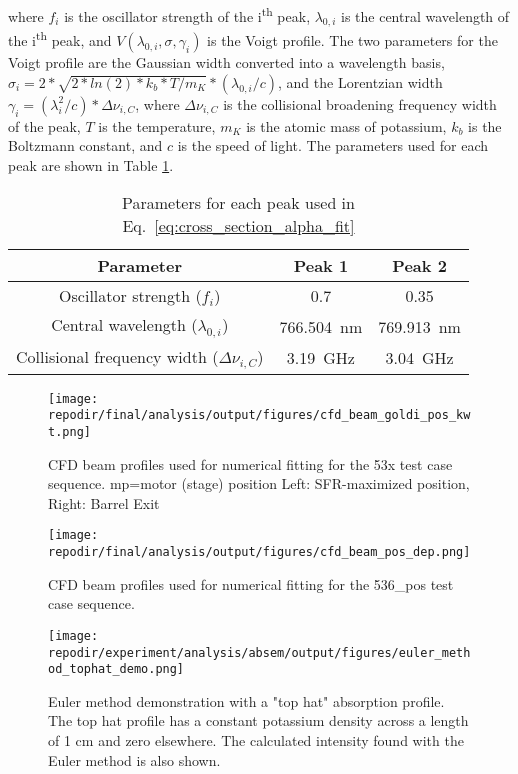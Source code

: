 where $f_i$ is the oscillator strength of the i\textsuperscript{th} peak, $\lambda_{0,i}$ is the central wavelength of the i\textsuperscript{th} peak, and $V(\lambda_{0,i},\sigma,\gamma_i)$ is the Voigt profile. The two parameters for the Voigt profile are the Gaussian width converted into a wavelength basis, $\sigma_i = 2*\sqrt{2*ln(2)*k_b*T/m_K}*(\lambda_{0,i}/c)$, and the Lorentzian width $\gamma_i = (\lambda_i^2/c)*\Delta \nu_{i,C}$, where $\Delta \nu_{i,C}$ is the collisional broadening frequency width of the peak, $T$ is the temperature, $m_K$ is the atomic mass of potassium, $k_b$ is the Boltzmann constant, and $c$ is the speed of light. The parameters used for each peak are shown in Table \ref{table:peak_parameters}. 

\begin{table}[H]
\centering
\begin{tabular}{|c|c|c|}
\hline
Parameter & Peak 1 & Peak 2 \\
\hline
Oscillator strength ($f_i$) & 0.7 & 0.35 \\
Central wavelength ($\lambda_{0,i}$) & \SI{766.504}{\nano\meter} & \SI{769.913}{\nano\meter} \\
Collisional frequency width ($\Delta \nu_{i,C}$) & \SI{3.19}{\giga\hertz} & \SI{3.04}{\giga\hertz} \\
\hline
\end{tabular}
\caption{Parameters for each peak used in Eq.\ \ref{eq:cross_section_alpha_fit}}
\label{table:peak_parameters}
\end{table}


\begin{figure}[]
    \centering
    \texttt{[image: \\repodir/final/analysis/output/figures/cfd\_beam\_goldi\_pos\_kwt.png]}
    \caption{CFD beam profiles used for numerical fitting for the 53x test case sequence. mp=motor (stage) position Left: SFR-maximized position, Right: Barrel Exit }
    \label{fig:SI_cfd_beam_goldi_pos_kwt}

    \texttt{[image: \\repodir/final/analysis/output/figures/cfd\_beam\_pos\_dep.png]}
    \caption{CFD beam profiles used for numerical fitting for the 536\_pos test case sequence.}
    \label{fig:SI_cfd_beam_pos_dep}
\end{figure}


\begin{figure}[]
    \centering
    \texttt{[image: \\repodir/experiment/analysis/absem/output/figures/euler\_method\_tophat\_demo.png]}
    \caption{Euler method demonstration with a "top hat" absorption profile. The top hat profile has a constant potassium density across a length of 1 cm and zero elsewhere. The calculated intensity found with the Euler method is also shown.}
    \label{fig:SI_euler_method_tophat_demo}
\end{figure}


